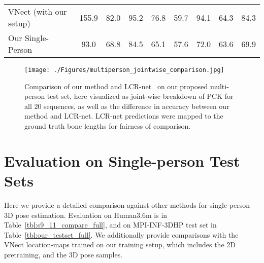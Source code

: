 \begin{table*}
{\begin{tabular}{@{}lcccccccr@{}}
\multicolumn{1}{l||}{\T VNect (with our setup) }                                                                & 155.9       & 82.0   &  95.2   & 76.8   & 59.7   & 94.1    & \multicolumn{1}{c||}{64.3}     & {84.3}  \\ 
\multicolumn{1}{l||}{\T Our Single-Person}                                                                & {93.0}       & {68.8}   & {84.5}    & {65.1}   & 57.6   & {72.0}    & \multicolumn{1}{c||}{63.6}     & {{69.9}}  \\ 
\end{tabular}
}
\end{table*} 
\begin{figure*}
  \begin{center}
  \texttt{[image: ./Figures/multiperson\_jointwise\_comparison.jpg]}
  \end{center}
  \vspace{-0.3cm}
  \caption
  {Comparison of our method and LCR-net~\cite{rogez_lcr_cvpr17} on our proposed multi-person test set, here visualized as joint-wise breakdown of PCK for all 20 sequences, as well as the difference in accuracy between our method and LCR-net. LCR-net predictions were mapped to the ground truth bone lengths for fairness of comparison.}
  \vspace{-0.5cm}
  \label{fig:jointwise_multi}
\end{figure*}

\section{Evaluation on Single-person Test Sets}
Here we provide a detailed comparison against other methods for single-person 3D pose estimation. Evaluation on Human3.6m is in Table~\ref{tbl:s9_11_compare_full}, and on MPI-INF-3DHP test set in Table~\ref{tbl:our_testset_full}. 
We additionally provide comparisons with the VNect location-maps trained on our training setup, which includes the 2D pretraining, and the 3D pose samples.

